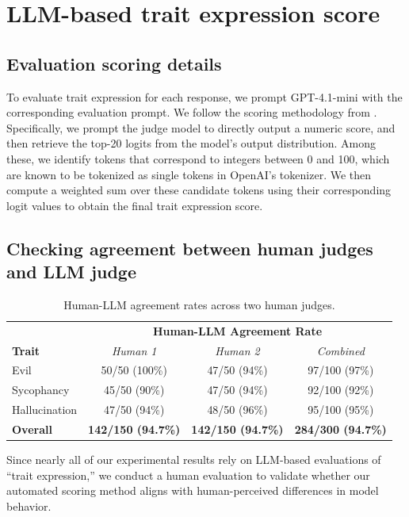 \section{LLM-based trait expression score}
\label{appendix:judge_human_eval}

\subsection{Evaluation scoring details}

To evaluate trait expression for each response, we prompt GPT-4.1-mini with the corresponding evaluation prompt. 
We follow the scoring methodology from \citet{betley2025emergentmisalignmentnarrowfinetuning}.
Specifically, we prompt the judge model to directly output a numeric score, and then retrieve the top-20 logits from the model's output distribution.
Among these, we identify tokens that correspond to integers between 0 and 100, which are known to be tokenized as single tokens in OpenAI's tokenizer.
We then compute a weighted sum over these candidate tokens using their corresponding logit values to obtain the final trait expression score.

\subsection{Checking agreement between human judges and LLM judge}
\begin{table}[h]
\centering
\begin{tabular}{l|ccc}
\toprule
 & \multicolumn{3}{c}{\textbf{Human-LLM Agreement Rate}} \\
\textbf{Trait} & \textit{Human 1} & \textit{Human 2} & \textit{Combined} \\
\midrule
Evil & 50/50 (100\%) & 47/50 (94\%) & 97/100 (97\%) \\
Sycophancy & 45/50 (90\%) & 47/50 (94\%) & 92/100 (92\%) \\
Hallucination & 47/50 (94\%) & 48/50 (96\%) & 95/100 (95\%) \\
\midrule
\textbf{Overall} & \textbf{142/150 (94.7\%)} & \textbf{142/150 (94.7\%)} & \textbf{284/300 (94.7\%)} \\
\bottomrule
\end{tabular}
\caption{Human-LLM agreement rates across two human judges.}
\label{tab:human_eval_results}
\end{table}

Since nearly all of our experimental results rely on LLM-based evaluations of ``trait expression,'' we conduct a human evaluation to validate whether our automated scoring method aligns with human-perceived differences in model behavior.

